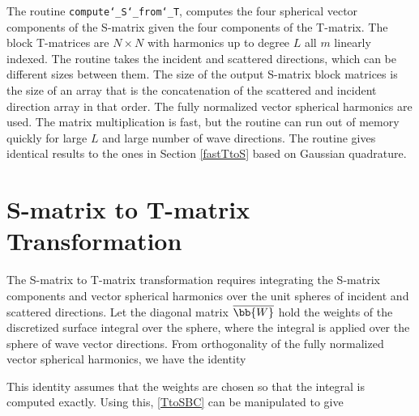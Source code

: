 The routine \texttt{compute\char`_S\char`_from\char`_T}, computes the four spherical vector components of the S-matrix given the four components of the T-matrix. The block T-matrices are $N \times N$ with harmonics up to degree $L$ all $m$ linearly indexed. The routine takes the incident and scattered directions, which can be different sizes between them. The size of the output S-matrix block matrices is the size of an array that is the concatenation of the scattered and incident direction array in that order. The fully normalized vector spherical harmonics are used. The matrix multiplication is fast, but the routine can run out of memory quickly for large $L$ and large number of wave directions. The routine gives identical results to the ones in Section \ref{fastTtoS} based on Gaussian quadrature.

{\footnotesize
{}
}


\section{S-matrix to T-matrix Transformation}
\label{secStoT}

The S-matrix to T-matrix transformation requires integrating the S-matrix components and vector spherical harmonics over the unit spheres of incident and scattered directions. Let the diagonal matrix $\overline{\bb{W}}$ hold the weights of the discretized surface integral over the sphere, where the integral is applied over the sphere of wave vector directions. From orthogonality of the fully normalized vector spherical harmonics, we have the identity

This identity assumes that the weights are chosen so that the integral is computed exactly. Using this, \eqref{TtoSBC} can be manipulated to give


